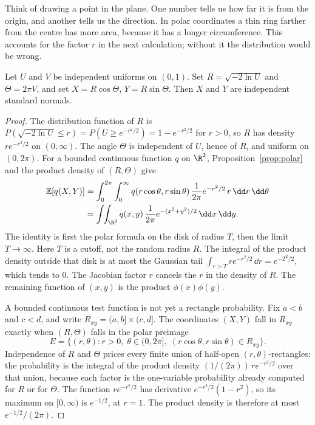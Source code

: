 Think of drawing a point in the plane. One number tells us how far it is from the origin, and another tells us the direction. In polar coordinates a thin ring farther from the centre has more area, because it has a longer circumference. This accounts for the factor $r$ in the next calculation; without it the distribution would be wrong.

\begin{theorem}\label{thm:boxmuller}
Let $U$ and $V$ be independent uniforms on $(0,1)$. Set $R=\sqrt{-2\ln U}$ and $\Theta=2\pi V$, and set $X=R\cos\Theta$, $Y=R\sin\Theta$. Then $X$ and $Y$ are independent standard normals.
\end{theorem}
\begin{proof}
The distribution function of $R$ is $P(\sqrt{-2\ln U}\le r)=P(U\ge e^{-r^2/2})=1-e^{-r^2/2}$ for $r>0$, so $R$ has density $r e^{-r^2/2}$ on $(0,\infty)$. The angle $\Theta$ is independent of $U$, hence of $R$, and uniform on $(0,2\pi)$. For a bounded continuous function $q$ on $\R^2$, Proposition~\ref{prop:polar} and the product density of $(R,\Theta)$ give
\begin{align*}
\mathbb E[q(X,Y)]
&=\int_0^{2\pi}\int_0^{\infty} q(r\cos\theta,r\sin\theta)\,\frac{1}{2\pi}e^{-r^2/2}\,r\,\dd r\,\dd\theta\\
&=\int\!\!\int_{\R^2} q(x,y)\,\frac{1}{2\pi}e^{-(x^2+y^2)/2}\,\dd x\,\dd y.
\end{align*}
The identity is first the polar formula on the disk of radius $T$, then the limit $T\to\infty$. Here $T$ is a cutoff, not the random radius $R$. The integral of the product density outside that disk is at most the Gaussian tail $\int_{r>T} r e^{-r^2/2}\,\dd r=e^{-T^2/2}$, which tends to $0$. The Jacobian factor $r$ cancels the $r$ in the density of $R$. The remaining function of $(x,y)$ is the product $\phi(x)\phi(y)$.

A bounded continuous test function is not yet a rectangle probability. Fix $a<b$ and $c<d$, and write $R_{xy}=(a,b]\times(c,d]$. The coordinates $(X,Y)$ fall in $R_{xy}$ exactly when $(R,\Theta)$ falls in the polar preimage
\[
 E=\bigl\{(r,\theta):r>0,\;\theta\in(0,2\pi],\;(r\cos\theta,r\sin\theta)\in R_{xy}\bigr\}.
\]
Independence of $R$ and $\Theta$ prices every finite union of half-open $(r,\theta)$-rectangles: the probability is the integral of the product density $(1/(2\pi))\,r e^{-r^2/2}$ over that union, because each factor is the one-variable probability already computed for $R$ or for $\Theta$. The function $r e^{-r^2/2}$ has derivative $e^{-r^2/2}(1-r^2)$, so its maximum on $[0,\infty)$ is $e^{-1/2}$, at $r=1$. The product density is therefore at most $e^{-1/2}/(2\pi)$.


\end{proof}
